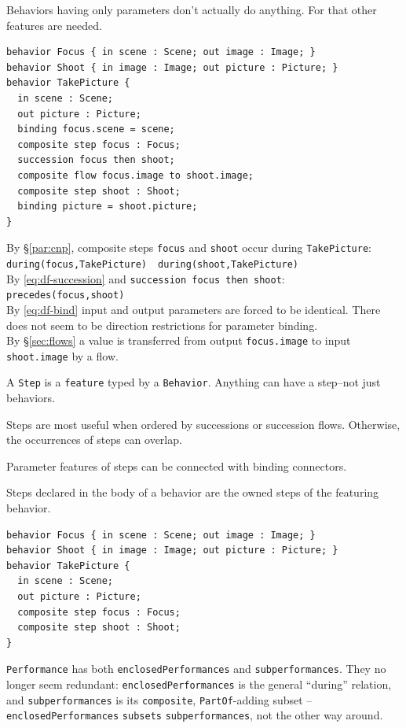 Behaviors having only parameters don't actually do anything.  For that other features are needed.

\begin{lstlisting}
behavior Focus { in scene : Scene; out image : Image; }
behavior Shoot { in image : Image; out picture : Picture; }
behavior TakePicture {
  in scene : Scene;
  out picture : Picture;
  binding focus.scene = scene;
  composite step focus : Focus;
  succession focus then shoot;
  composite flow focus.image to shoot.image;
  composite step shoot : Shoot;
  binding picture = shoot.picture;
}
\end{lstlisting}

\pn By \S\ref{par:cnp}, composite steps \texttt{focus} and \texttt{shoot} occur during \texttt{TakePicture}:\\
\texttt{during(focus,TakePicture)}~~\texttt{during(shoot,TakePicture)}\\
By \ref{eq:df-succession} and \texttt{succession focus then shoot}:\\
\texttt{precedes(focus,shoot)}\\
By \ref{eq:df-bind} input and output parameters are forced to be identical.  There does not seem to be direction restrictions for parameter binding.\\
By \S\ref{sec:flows} a value is transferred from output \texttt{focus.image} to input \texttt{shoot.image} by a flow.


\pn A \texttt{Step} is a \texttt{feature} typed by a \texttt{Behavior}.  Anything can have a step--not just behaviors.

\pn Steps are most useful when ordered by successions or succession flows.  Otherwise, the occurrences of steps can overlap.

\pn Parameter features of steps can be connected with binding connectors.

Steps declared in the body of a behavior are the owned steps of the featuring behavior.
\begin{lstlisting}
behavior Focus { in scene : Scene; out image : Image; }
behavior Shoot { in image : Image; out picture : Picture; }
behavior TakePicture {
  in scene : Scene;
  out picture : Picture;
  composite step focus : Focus;
  composite step shoot : Shoot;
}
\end{lstlisting}

\pn \texttt{Performance} has both \texttt{enclosedPerformances} and \texttt{subperformances}.  They no
longer seem redundant: \texttt{enclosedPerformances} is the general ``during'' relation, and
\texttt{subperformances} is its \texttt{composite}, \texttt{PartOf}-adding subset --
\texttt{enclosedPerformances} \texttt{subsets} \texttt{subperformances}, not the other way around.


